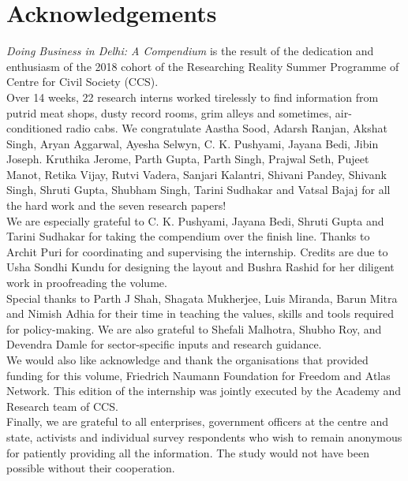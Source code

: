 \documentclass[a4paper, 12pt]{article}
\begin{document}
                    

\newpage
{}

\newpage
\section*{Acknowledgements}


\textit{Doing Business in Delhi: A Compendium} is the result of the dedication and enthusiasm of the 2018 cohort of the Researching Reality Summer Programme of Centre for Civil Society (CCS). \\

Over 14 weeks, 22 research interns worked tirelessly to find information from putrid meat shops, dusty record rooms, grim alleys and sometimes, air-conditioned radio cabs. We congratulate Aastha Sood, Adarsh Ranjan, Akshat Singh, Aryan Aggarwal, Ayesha Selwyn, C. K. Pushyami, Jayana Bedi, Jibin Joseph. Kruthika Jerome, Parth Gupta, Parth Singh, Prajwal Seth, Pujeet Manot, Retika Vijay, Rutvi Vadera, Sanjari Kalantri, Shivani Pandey, Shivank Singh, Shruti Gupta, Shubham Singh, Tarini Sudhakar and Vatsal Bajaj for all the hard work and the seven research papers!\\

We are especially grateful to C. K. Pushyami, Jayana Bedi, Shruti Gupta and Tarini Sudhakar for taking the compendium over the finish line. Thanks to Archit Puri for coordinating and supervising the internship. Credits are due to Usha Sondhi Kundu for designing the layout and Bushra Rashid for her diligent work in proofreading the volume. \\

Special thanks to Parth J Shah, Shagata Mukherjee, Luis Miranda, Barun Mitra and Nimish Adhia for their time in teaching the values, skills and tools required for policy-making. We are also grateful to Shefali Malhotra, Shubho Roy, and Devendra Damle for sector-specific inputs and research guidance. \\

We would also like acknowledge and thank the organisations that provided funding for this volume, Friedrich Naumann Foundation for Freedom and Atlas Network. This edition of the internship was jointly executed by the Academy and Research team of CCS. \\

Finally, we are grateful to all enterprises, government officers at the centre and state, activists and individual survey respondents who wish to remain anonymous for patiently providing all the information. The study would not have been possible without their cooperation. \\
\end{document}
